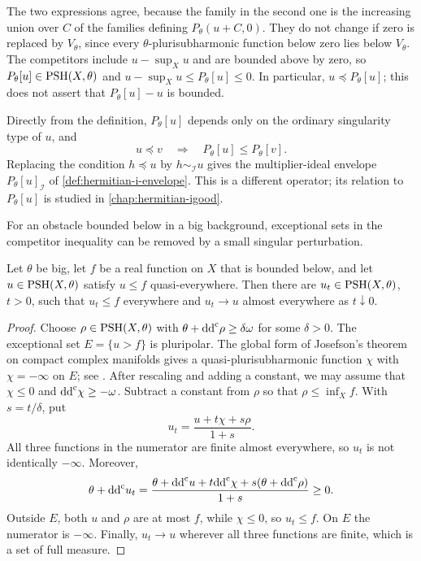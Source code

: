 The two expressions agree, because the family in the second one is the increasing union over $C$ of the families defining $P_\theta(u+C,0)$. They do not change if zero is replaced by $V_\theta$, since every $\theta$-plurisubharmonic function below zero lies below $V_\theta$. The competitors include $u-\sup_Xu$ and are bounded above by zero, so $P_\theta[u]\in\mathrm{PSH}(X,\theta)$ and $u-\sup_Xu\leq P_\theta[u]\leq0$. In particular, $u\preceq P_\theta[u]$; this does not assert that $P_\theta[u]-u$ is bounded.

Directly from the definition, $P_\theta[u]$ depends only on the ordinary singularity type of $u$, and
\[
 u\preceq v\quad\Longrightarrow\quad P_\theta[u]\leq P_\theta[v].
\]
Replacing the condition $h\preceq u$ by $h\sim_{\mathcal I}u$ gives the multiplier-ideal envelope $P_\theta[u]_{\mathcal I}$ of \cref{def:hermitian-i-envelope}. This is a different operator; its relation to $P_\theta[u]$ is studied in \cref{chap:hermitian-igood}.

For an obstacle bounded below in a big background, exceptional sets in the competitor inequality can be removed by a small singular perturbation.

\begin{lemma}
\label{lem:big-pointwise-competitor}
Let $\theta$ be big, let $f$ be a real function on $X$ that is bounded below, and let $u\in\mathrm{PSH}(X,\theta)$ satisfy $u\leq f$ quasi-everywhere. Then there are $u_t\in\mathrm{PSH}(X,\theta)$, $t>0$, such that $u_t\leq f$ everywhere and $u_t\to u$ almost everywhere as $t\downarrow0$.
\end{lemma}
\begin{proof}
Choose $\rho\in\mathrm{PSH}(X,\theta)$ with $\theta+\mathrm{dd}^{\mathrm{c}}\rho\geq\delta\omega$ for some $\delta>0$. The exceptional set $E=\{u>f\}$ is pluripolar. The global form of Josefson's theorem on compact complex manifolds gives a quasi-plurisubharmonic function $\chi$ with $\chi=-\infty$ on $E$; see \cite[Theorem~1.1.5]{SGPT}. After rescaling and adding a constant, we may assume that $\chi\leq0$ and $\mathrm{dd}^{\mathrm{c}}\chi\geq-\omega$. Subtract a constant from $\rho$ so that $\rho\leq\inf_X f$. With $s=t/\delta$, put
\[
 u_t=\frac{u+t\chi+s\rho}{1+s}.
\]
All three functions in the numerator are finite almost everywhere, so $u_t$ is not identically $-\infty$. Moreover,
\[
 \theta+\mathrm{dd}^{\mathrm{c}} u_t
 =\frac{\theta+\mathrm{dd}^{\mathrm{c}} u+t\mathrm{dd}^{\mathrm{c}}\chi+s(\theta+\mathrm{dd}^{\mathrm{c}}\rho)}{1+s}
 \geq0.
\]
Outside $E$, both $u$ and $\rho$ are at most $f$, while $\chi\leq0$, so $u_t\leq f$. On $E$ the numerator is $-\infty$. Finally, $u_t\to u$ wherever all three functions are finite, which is a set of full measure.
\end{proof}

